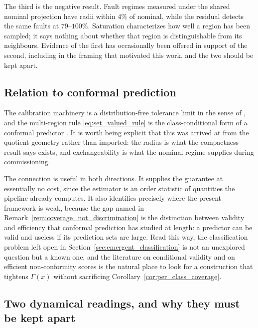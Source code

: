 \documentclass[a4paper]{cas-sc}
\begin{document}
The third is the negative result. Fault regimes measured under the shared
nominal projection have radii within \(4\%\) of nominal, while the residual
detects the same faults at \(79\)--\(100\%\). Saturation characterizes how well
a region has been sampled; it says nothing about whether that region is
distinguishable from its neighbours. Evidence of the first has occasionally
been offered in support of the second, including in the framing that motivated
this work, and the two should be kept apart.

\subsection{Relation to conformal prediction}
\label{subsec:disc_conformal}

The calibration machinery is a distribution-free tolerance limit in the sense
of \citet{wilks1941}, and the multi-region rule
\eqref{eq:set_valued_rule} is the class-conditional form of a conformal
predictor \citep{vovk2005,shafer2008}. It is worth being explicit that this
was arrived at from the quotient geometry rather than imported: the radius is
what the compactness result says exists, and exchangeability is what the
nominal regime supplies during commissioning.

The connection is useful in both directions. It supplies the guarantee at
essentially no cost, since the estimator is an order statistic of quantities
the pipeline already computes. It also identifies precisely where the present
framework is weak, because the gap named in
Remark~\ref{rem:coverage_not_discrimination} is the distinction between
validity and efficiency that conformal prediction has studied at length: a
predictor can be valid and useless if its prediction sets are large. Read this
way, the classification problem left open in
Section~\ref{sec:emergent_classification} is not an unexplored question but a
known one, and the literature on conditional validity and on efficient
non-conformity scores is the natural place to look for a construction that
tightens \(\Gamma(x)\) without sacrificing
Corollary~\ref{cor:per_class_coverage}.

\subsection{Two dynamical readings, and why they must be kept apart}
\label{subsec:disc_dynamics}
\end{document}

